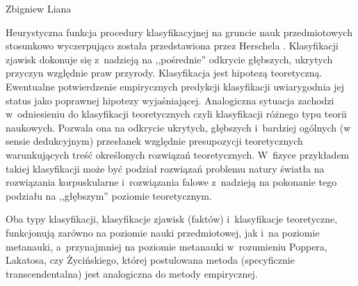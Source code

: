 \begin{artplenv}{Zbigniew Liana}
\begin{uwaga}
Heurystyczna funkcja procedury klasyfikacyjnej na gruncie nauk przedmiotowych stosunkowo wyczerpująco
została przedstawiona przez Herschela \parencite*[s.~131–139]{herschel_wstep_1955}.
Klasyfikacji zjawisk
dokonuje się z~nadzieją na ,,pośrednie'' odkrycie głębszych, ukrytych przyczyn względnie praw przyrody. Klasyfikacja jest
hipotezą teoretyczną. Ewentualne potwierdzenie empirycznych predykcji klasyfikacji uwiarygodnia jej status jako
poprawnej hipotezy wyjaśniającej. Analogiczna sytuacja zachodzi w~odniesieniu do klasyfikacji teoretycznych czyli
klasyfikacji różnego typu teorii naukowych. Pozwala ona na odkrycie ukrytych, głębszych i~bardziej ogólnych (w sensie
dedukcyjnym) przesłanek względnie presupozycji teoretycznych warunkujących treść określonych rozwiązań
teoretycznych. W~fizyce przykładem takiej klasyfikacji może być podział rozwiązań problemu natury światła na rozwiązania
korpuskularne i~rozwiązania falowe z~nadzieją na pokonanie tego podziału na ,,głębszym'' poziomie teoretycznym.
\end{uwaga}

Oba typy klasyfikacji, klasyfikacje zjawisk (faktów) i~klasyfikacje teoretyczne, funkcjonują zarówno na poziomie nauki
przedmiotowej, jak i~na poziomie metanauki, a~przynajmniej na poziomie metanauki w~rozumieniu Poppera, Lakatosa, czy
Życińskiego, której postulowana metoda (specyficznie transcendentalna) jest analogiczna do metody empirycznej.


\end{artplenv}
